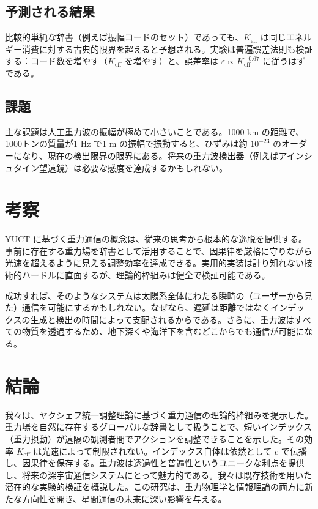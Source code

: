\documentclass[12pt,a4paper]{article}
\newcommand{\Keff}{K_{\mathrm{eff}}}
\newcommand{\eps}{\varepsilon}
\begin{document}
	\subsection{予測される結果}
	
	比較的単純な辞書（例えば振幅コードのセット）であっても、\(\Keff\) は同じエネルギー消費に対する古典的限界を超えると予想される。実験は普遍誤差法則も検証する：コード数を増やす（\(\Keff\) を増やす）と、誤差率は \(\eps \propto \Keff^{-0.67}\) に従うはずである。
	
	\subsection{課題}
	
	主な課題は人工重力波の振幅が極めて小さいことである。1000 km の距離で、1000トンの質量が1 Hz で1 m の振幅で振動すると、ひずみは約 \(10^{-23}\) のオーダーになり、現在の検出限界の限界にある。将来の重力波検出器（例えばアインシュタイン望遠鏡）は必要な感度を達成するかもしれない。
	
	\section{考察}
	\label{sec:discussion}
	
	YUCT に基づく重力通信の概念は、従来の思考から根本的な逸脱を提供する。事前に存在する重力場を辞書として活用することで、因果律を厳格に守りながら光速を超えるように見える調整効率を達成できる。実用的実装は計り知れない技術的ハードルに直面するが、理論的枠組みは健全で検証可能である。
	
	成功すれば、そのようなシステムは太陽系全体にわたる瞬時の（ユーザーから見た）通信を可能にするかもしれない。なぜなら、遅延は距離ではなくインデックスの生成と検出の時間によって支配されるからである。さらに、重力波はすべての物質を透過するため、地下深くや海洋下を含むどこからでも通信が可能になる。
	
	\section{結論}
	\label{sec:conclusion}
	
	我々は、ヤクシェフ統一調整理論に基づく重力通信の理論的枠組みを提示した。重力場を自然に存在するグローバルな辞書として扱うことで、短いインデックス（重力摂動）が遠隔の観測者間でアクションを調整できることを示した。その効率 \(\Keff\) は光速によって制限されない。インデックス自体は依然として \(c\) で伝播し、因果律を保存する。重力波は透過性と普遍性というユニークな利点を提供し、将来の深宇宙通信システムにとって魅力的である。我々は既存技術を用いた潜在的な実験的検証を概説した。この研究は、重力物理学と情報理論の両方に新たな方向性を開き、星間通信の未来に深い影響を与える。
	
\end{document}
